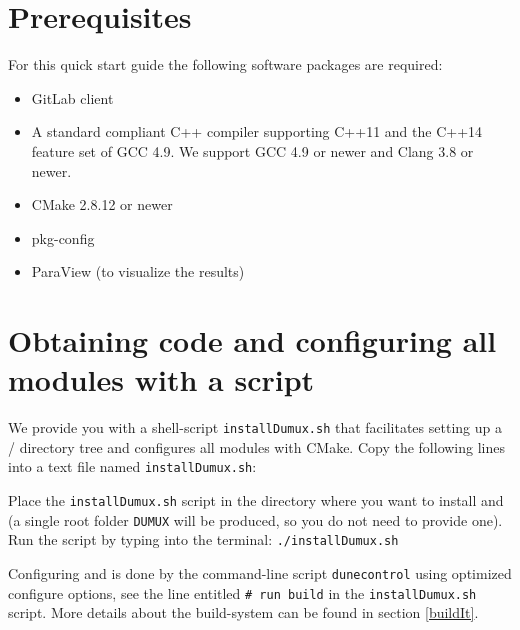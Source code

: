 \section{Prerequisites} \label{sec:prerequisites}
For this quick start guide the following software packages are required:
\begin{itemize}
\item GitLab client
\item A standard compliant C++ compiler supporting C++11 and the C++14 feature set of GCC 4.9. We support GCC 4.9 or newer and Clang 3.8 or newer.
\item CMake 2.8.12 or newer
\item pkg-config
\item ParaView (to visualize the results)
\end{itemize}

\section{Obtaining code and configuring all modules with a script}
We provide you with a shell-script \texttt{installDumux.sh} that facilitates setting up a {\Dune}/{\Dumux} directory tree
and configures all modules with CMake.
Copy the following lines into a text file named \texttt{installDumux.sh}:


Place the \texttt{installDumux.sh} script in the directory where you want to install \Dumux and \Dune (a single
root folder \texttt{DUMUX} will be produced, so you do not need to provide one).
Run the script by typing into the terminal: \texttt{./installDumux.sh}

Configuring \Dune and \Dumux is done by the command-line script \texttt{dunecontrol}
using optimized configure options, see the line entitled \texttt{\# run build} in the \texttt{installDumux.sh} script.
More details about the build-system can be found in section \ref{buildIt}.

